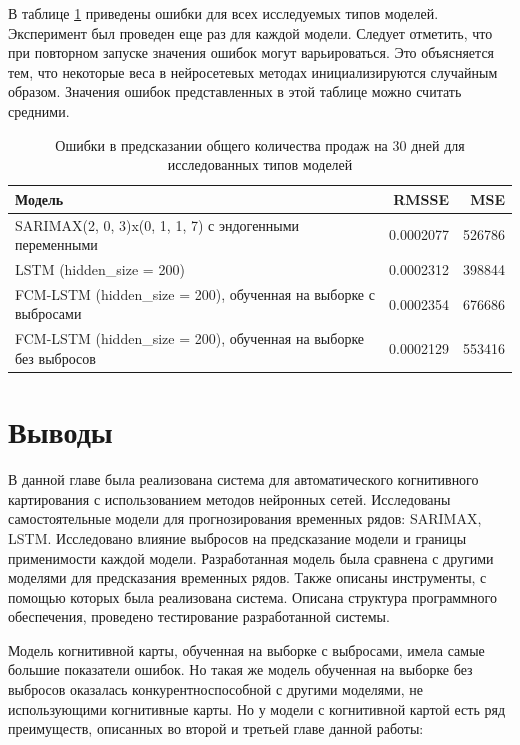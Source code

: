 В таблице \ref{tbl:all_models_comparation} приведены ошибки для всех исследуемых типов моделей.
Эксперимент был проведен еще раз для каждой модели. Следует отметить, что при повторном
запуске значения ошибок могут варьироваться. Это объясняется тем, что некоторые веса
в нейросетевых методах инициализируются случайным образом. Значения ошибок представленных
в этой таблице можно считать средними.

\begin{table}
    \caption{ Ошибки в предсказании общего количества продаж на 30 дней для исследованных типов моделей }
    \centering
    \begin{tabular}{|l|r||r|}
        \hline
            Модель                                                            & RMSSE     & MSE    \\
        \hline
            SARIMAX(2, 0, 3)x(0, 1, 1, 7) с эндогенными переменными           & 0.0002077 & 526786 \\
            LSTM (hidden\_size = 200)                                         & 0.0002312 & 398844 \\
            FCM-LSTM (hidden\_size = 200), обученная на выборке с выбросами   & 0.0002354 & 676686 \\
            FCM-LSTM (hidden\_size = 200), обученная на выборке без выбросов  & 0.0002129 & 553416 \\
        \hline
    \end{tabular}
    \label{tbl:all_models_comparation}
\end{table}

\section{Выводы}

В данной главе была реализована система для автоматического когнитивного картирования с использованием
методов нейронных сетей. Исследованы самостоятельные модели для прогнозирования временных рядов:
SARIMAX, LSTM.
Исследовано влияние выбросов на предсказание модели и границы применимости каждой модели.
Разработанная модель была сравнена с другими моделями для предсказания временных рядов.
Также описаны инструменты, с помощью которых была реализована система.
Описана структура программного обеспечения, проведено тестирование разработанной системы.

Модель когнитивной карты, обученная на выборке с выбросами, имела самые большие показатели
ошибок. Но такая же модель обученная на выборке без выбросов
оказалась конкурентноспособной с другими моделями, не использующими
когнитивные карты. Но у модели с когнитивной картой есть ряд преимуществ,
описанных во второй и третьей главе данной работы:

